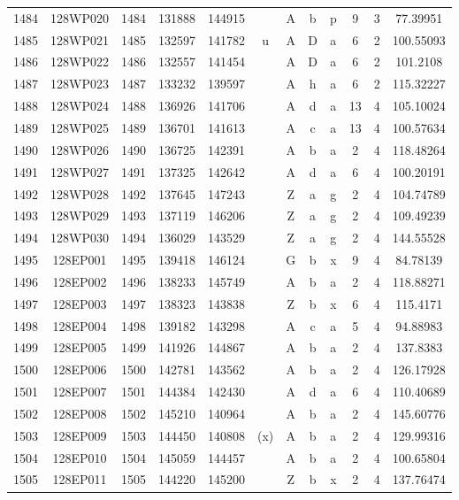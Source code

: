 \begin{tabular}{|*{12}{c|}}
1484 & 128WP020 & 1484 & 131888 & 144915 &  & A & b & p & 9 & 3 & 77.39951 \\ 
1485 & 128WP021 & 1485 & 132597 & 141782 & u & A & D & a & 6 & 2 & 100.55093 \\ 
1486 & 128WP022 & 1486 & 132557 & 141454 &  & A & D & a & 6 & 2 & 101.2108 \\ 
1487 & 128WP023 & 1487 & 133232 & 139597 &  & A & h & a & 6 & 2 & 115.32227 \\ 
1488 & 128WP024 & 1488 & 136926 & 141706 &  & A & d & a & 13 & 4 & 105.10024 \\ 
1489 & 128WP025 & 1489 & 136701 & 141613 &  & A & c & a & 13 & 4 & 100.57634 \\ 
1490 & 128WP026 & 1490 & 136725 & 142391 &  & A & b & a & 2 & 4 & 118.48264 \\ 
1491 & 128WP027 & 1491 & 137325 & 142642 &  & A & d & a & 6 & 4 & 100.20191 \\ 
1492 & 128WP028 & 1492 & 137645 & 147243 &  & Z & a & g & 2 & 4 & 104.74789 \\ 
1493 & 128WP029 & 1493 & 137119 & 146206 &  & Z & a & g & 2 & 4 & 109.49239 \\ 
1494 & 128WP030 & 1494 & 136029 & 143529 &  & Z & a & g & 2 & 4 & 144.55528 \\ 
1495 & 128EP001 & 1495 & 139418 & 146124 &  & G & b & x & 9 & 4 & 84.78139 \\ 
1496 & 128EP002 & 1496 & 138233 & 145749 &  & A & b & a & 2 & 4 & 118.88271 \\ 
1497 & 128EP003 & 1497 & 138323 & 143838 &  & Z & b & x & 6 & 4 & 115.4171 \\ 
1498 & 128EP004 & 1498 & 139182 & 143298 &  & A & c & a & 5 & 4 & 94.88983 \\ 
1499 & 128EP005 & 1499 & 141926 & 144867 &  & A & b & a & 2 & 4 & 137.8383 \\ 
1500 & 128EP006 & 1500 & 142781 & 143562 &  & A & b & a & 2 & 4 & 126.17928 \\ 
1501 & 128EP007 & 1501 & 144384 & 142430 &  & A & d & a & 6 & 4 & 110.40689 \\ 
1502 & 128EP008 & 1502 & 145210 & 140964 &  & A & b & a & 2 & 4 & 145.60776 \\ 
1503 & 128EP009 & 1503 & 144450 & 140808 & (x) & A & b & a & 2 & 4 & 129.99316 \\ 
1504 & 128EP010 & 1504 & 145059 & 144457 &  & A & b & a & 2 & 4 & 100.65804 \\ 
1505 & 128EP011 & 1505 & 144220 & 145200 &  & Z & b & x & 2 & 4 & 137.76474 \\ 

\end{tabular}
